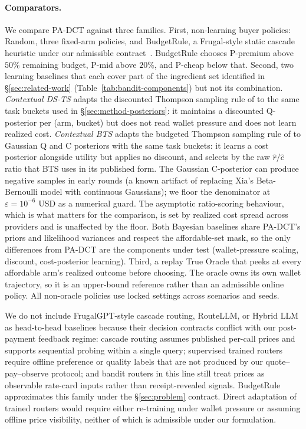\paragraph{Comparators.}
We compare PA-DCT against three families. First, non-learning buyer policies: Random, three fixed-arm policies, and BudgetRule, a Frugal-style static cascade heuristic under our admissible contract~\citep{chen2023frugalgpt}. BudgetRule chooses P-premium above $50\%$ remaining budget, P-mid above $20\%$, and P-cheap below that. Second, two learning baselines that each cover part of the ingredient set identified in \S\ref{sec:related-work} (Table~\ref{tab:bandit-components}) but not its combination. \emph{Contextual DS-TS} adapts the discounted Thompson sampling rule of \citet{qi2023dsts} to the same task buckets used in \S\ref{sec:method-posteriors}: it maintains a discounted Q-posterior per (arm, bucket) but does not read wallet pressure and does not learn realized cost. \emph{Contextual BTS} adapts the budgeted Thompson sampling rule of \citet{xia2015bts} to Gaussian Q and C posteriors with the same task buckets: it learns a cost posterior alongside utility but applies no discount, and selects by the raw $\hat r / \hat c$ ratio that BTS uses in its published form. The Gaussian C-posterior can produce negative samples in early rounds (a known artifact of replacing Xia's Beta-Bernoulli model with continuous Gaussians); we floor the denominator at $\varepsilon=10^{-6}$ USD as a numerical guard. The asymptotic ratio-scoring behaviour, which is what matters for the comparison, is set by realized cost spread across providers and is unaffected by the floor. Both Bayesian baselines share PA-DCT's priors and likelihood variances and respect the affordable-set mask, so the only differences from PA-DCT are the components under test (wallet-pressure scaling, discount, cost-posterior learning). Third, a replay True Oracle that peeks at every affordable arm's realized outcome before choosing. The oracle owns its own wallet trajectory, so it is an upper-bound reference rather than an admissible online policy. All non-oracle policies use locked settings across scenarios and seeds.

We do not include FrugalGPT-style cascade routing, RouteLLM, or Hybrid LLM as head-to-head baselines because their decision contracts conflict with our post-payment feedback regime: cascade routing assumes published per-call prices and supports sequential probing within a single query; supervised trained routers require offline preference or quality labels that are not produced by our quote--pay--observe protocol; and bandit routers in this line still treat prices as observable rate-card inputs rather than receipt-revealed signals. BudgetRule approximates this family under the \S\ref{sec:problem} contract. Direct adaptation of trained routers would require either re-training under wallet pressure or assuming offline price visibility, neither of which is admissible under our formulation.

